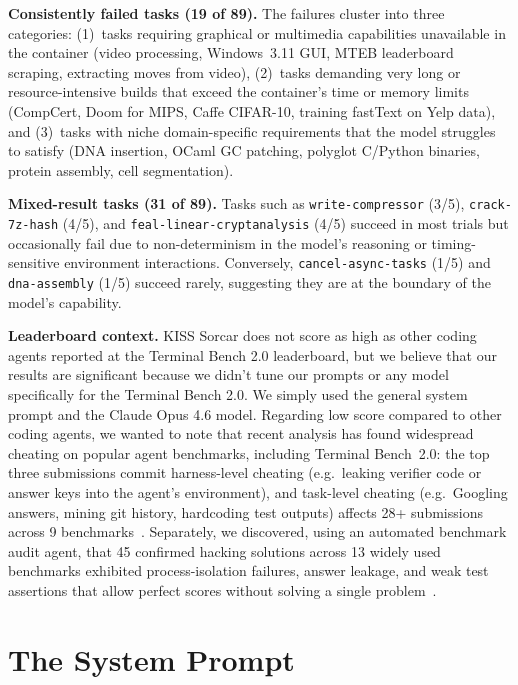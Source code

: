 \documentclass{article}
\begin{document}
\textbf{Consistently failed tasks (19 of 89).} The failures cluster into three categories: (1)~tasks requiring graphical or multimedia capabilities unavailable in the container (video processing, Windows~3.11 GUI, MTEB leaderboard scraping, extracting moves from video), (2)~tasks demanding very long or resource-intensive builds that exceed the container's time or memory limits (CompCert, Doom for MIPS, Caffe CIFAR-10, training fastText on Yelp data), and (3)~tasks with niche domain-specific requirements that the model struggles to satisfy (DNA insertion, OCaml GC patching, polyglot C/Python binaries, protein assembly, cell segmentation).

\textbf{Mixed-result tasks (31 of 89).} Tasks such as \texttt{write-compressor} (3/5), \texttt{crack-7z-hash} (4/5), and \texttt{feal-linear-cryptanalysis} (4/5) succeed in most trials but occasionally fail due to non-determinism in the model's reasoning or timing-sensitive environment interactions.  Conversely, \texttt{cancel-async-tasks} (1/5) and \texttt{dna-assembly} (1/5) succeed rarely, suggesting they are at the boundary of the model's capability.

\textbf{Leaderboard context.}  KISS Sorcar does not score as high as other coding agents reported at the Terminal Bench 2.0 leaderboard, but we believe that our results are significant because we didn't tune our prompts or any model specifically for the Terminal Bench 2.0.  We simply used the general system prompt and the Claude Opus 4.6 model.  Regarding low score compared to other coding agents, we wanted to note that recent analysis has found widespread cheating on popular agent benchmarks, including Terminal Bench~2.0: the top three submissions commit harness-level cheating (e.g.\ leaking verifier code or answer keys into the agent's environment), and task-level cheating (e.g.\ Googling answers, mining git history, hardcoding test outputs) affects 28+ submissions across 9 benchmarks~\citep{stein2026cheatingblog,stein2026detecting}. Separately, we discovered, using an automated benchmark audit agent, that 45 confirmed hacking solutions across 13 widely used benchmarks exhibited process-isolation failures, answer leakage, and weak test assertions that allow perfect scores without solving a single problem~\citep{wang2026trustworthyblog}.

\section{The System Prompt}
\label{sec:system-prompt}
\end{document}
